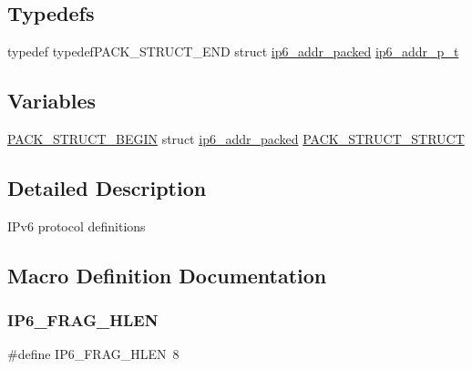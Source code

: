 \subsection*{Typedefs}
\begin{DoxyCompactItemize}
\item 
typedef typedef\+P\+A\+C\+K\+\_\+\+S\+T\+R\+U\+C\+T\+\_\+\+E\+ND struct \hyperlink{structip6__addr__packed}{ip6\+\_\+addr\+\_\+packed} \hyperlink{openmote-cc2538_2lwip_2src_2include_2lwip_2prot_2ip6_8h_a560932a657f17ec5a0a3a78a1ce7e60a}{ip6\+\_\+addr\+\_\+p\+\_\+t}
\end{DoxyCompactItemize}
\subsection*{Variables}
\begin{DoxyCompactItemize}
\item 
\hyperlink{group__compiler__abstraction_ga73199061891adf1b912d20835c7d5e96}{P\+A\+C\+K\+\_\+\+S\+T\+R\+U\+C\+T\+\_\+\+B\+E\+G\+IN} struct \hyperlink{structip6__addr__packed}{ip6\+\_\+addr\+\_\+packed} \hyperlink{openmote-cc2538_2lwip_2src_2include_2lwip_2prot_2ip6_8h_a12d53f506842c4aa511edf9e28746539}{P\+A\+C\+K\+\_\+\+S\+T\+R\+U\+C\+T\+\_\+\+S\+T\+R\+U\+CT}
\end{DoxyCompactItemize}


\subsection{Detailed Description}
I\+Pv6 protocol definitions 

\subsection{Macro Definition Documentation}
\mbox{\label{openmote-cc2538_2lwip_2src_2include_2lwip_2prot_2ip6_8h_aacda00cc76d9e7f9f3197de3b27089ea}} 
\subsubsection{\texorpdfstring{I\+P6\+\_\+\+F\+R\+A\+G\+\_\+\+H\+L\+EN}{IP6\_FRAG\_HLEN}}
{\footnotesize\ttfamily \#define I\+P6\+\_\+\+F\+R\+A\+G\+\_\+\+H\+L\+EN~8}

